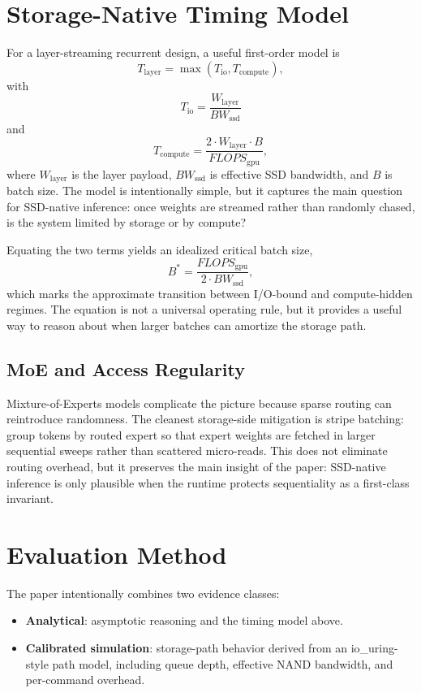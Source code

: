 \documentclass[11pt]{article}
\begin{document}
\section{Storage-Native Timing Model}
For a layer-streaming recurrent design, a useful first-order model is
\begin{equation}
T_{\text{layer}} = \max(T_{\text{io}}, T_{\text{compute}}),
\end{equation}
with
\begin{equation}
T_{\text{io}} = \frac{W_{\text{layer}}}{BW_{\text{ssd}}}
\end{equation}
and
\begin{equation}
T_{\text{compute}} = \frac{2 \cdot W_{\text{layer}} \cdot B}{FLOPS_{\text{gpu}}},
\end{equation}
where $W_{\text{layer}}$ is the layer payload, $BW_{\text{ssd}}$ is effective SSD bandwidth, and $B$ is batch size. The model is intentionally simple, but it captures the main question for SSD-native inference: once weights are streamed rather than randomly chased, is the system limited by storage or by compute?

Equating the two terms yields an idealized critical batch size,
\begin{equation}
B^\ast = \frac{FLOPS_{\text{gpu}}}{2 \cdot BW_{\text{ssd}}},
\end{equation}
which marks the approximate transition between I/O-bound and compute-hidden regimes. The equation is not a universal operating rule, but it provides a useful way to reason about when larger batches can amortize the storage path.

\subsection{MoE and Access Regularity}
Mixture-of-Experts models complicate the picture because sparse routing can reintroduce randomness. The cleanest storage-side mitigation is stripe batching: group tokens by routed expert so that expert weights are fetched in larger sequential sweeps rather than scattered micro-reads. This does not eliminate routing overhead, but it preserves the main insight of the paper: SSD-native inference is only plausible when the runtime protects sequentiality as a first-class invariant.

\section{Evaluation Method}
The paper intentionally combines two evidence classes:
\begin{itemize}
    \item \textbf{Analytical}: asymptotic reasoning and the timing model above.
    \item \textbf{Calibrated simulation}: storage-path behavior derived from an io\_uring-style path model, including queue depth, effective NAND bandwidth, and per-command overhead.
\end{itemize}
\end{document}
